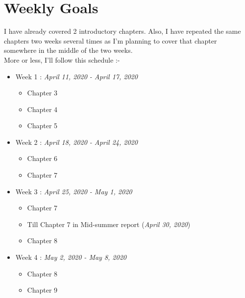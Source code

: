 \documentclass[11pt]{article}
\begin{document}
\section*{Weekly Goals}
I have already covered 2 introductory chapters. Also, I have repeated the same chapters two weeks several times as I’m planning to cover that chapter somewhere in the middle of the two weeks.\\
More or less, I'll follow this schedule :-

\begin{itemize}
	\item Week 1 : \textit{April 11, 2020 - April 17, 2020}
	\begin{itemize}
		\itemsep-1mm
		\item Chapter 3
		\item Chapter 4
		\item Chapter 5
	\end{itemize}
\end{itemize}

\begin{itemize}
	\item Week 2 : \textit{April 18, 2020 - April 24, 2020}
	\begin{itemize}
		\itemsep-1mm
		\item Chapter 6
		\item Chapter 7
	\end{itemize}
\end{itemize}

\begin{itemize}
	\item Week 3 : \textit{April 25, 2020 - May 1, 2020}
	\begin{itemize}
		\itemsep-1mm
		\item Chapter 7
		\item Till Chapter 7 in Mid-summer report (\textit{April 30, 2020})
		\item Chapter 8
	\end{itemize}
\end{itemize}

\begin{itemize}
	\item Week 4 : \textit{May 2, 2020 - May 8, 2020}
	\begin{itemize}
		\itemsep-1mm
		\item Chapter 8
		\item Chapter 9
	\end{itemize}
\end{itemize}
\end{document}
